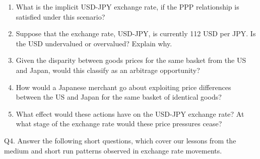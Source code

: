 \documentclass[12pt]{article}
\begin{document}
\begin{enumerate}[1)]
	\item What is the implicit USD-JPY exchange rate, if the PPP relationship is satisfied under this scenario?
	
	\newpage
	
	\item Suppose that the exchange rate, USD-JPY, is currently 112 USD per JPY. Is the USD undervalued or overvalued? Explain why.
	
	\vspace{1.5in}
	
	\item Given the disparity between goods prices for the same basket from the US and Japan, would this classify as an arbitrage opportunity?  
	
	
	\vspace{1.5in}
	
	\item How would a Japanese merchant go about exploiting price differences between the US and Japan for the same basket of identical goods?
	
	\vspace{1.5in}
	
	
	\item What effect would these actions have on the USD-JPY exchange rate? At what stage of the exchange rate would these price pressures cease?
	
	\vspace{1.5in}
	
\end{enumerate}

\noindent Q4. Answer the following short questions, which cover our lessons from the medium and short run patterns observed in exchange rate movements.
\end{document}
